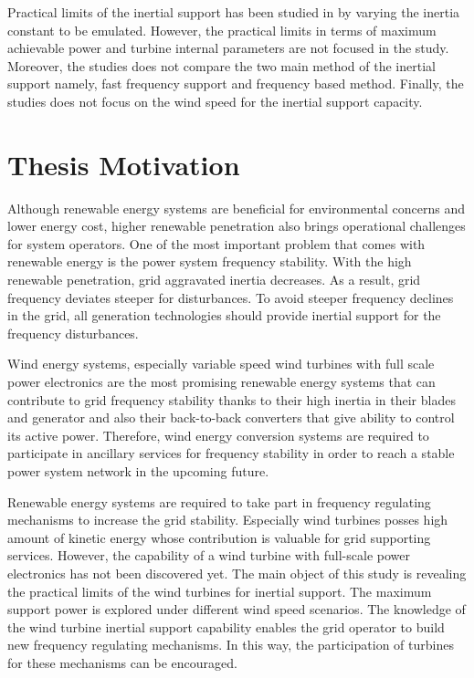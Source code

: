 Practical limits of the inertial support has been studied in \cite{Gonzalez-Longatt2016} by varying the inertia constant to be emulated. However, the practical limits in terms of maximum achievable power and turbine internal parameters are not focused in the study. Moreover, the studies does not compare the two main method of the inertial support namely, fast frequency support and frequency based method. Finally, the studies does not focus on the wind speed for the inertial support capacity. 

\section{Thesis Motivation}
Although renewable energy systems are beneficial for environmental concerns and lower energy cost, higher renewable penetration also brings operational challenges for system operators. One of the most important problem that comes with renewable energy is the power system frequency stability. With the high renewable penetration, grid aggravated inertia decreases. As a result, grid frequency deviates steeper for disturbances. To avoid steeper frequency declines in the grid, all generation technologies should provide inertial support for the frequency disturbances.\par
Wind energy systems, especially variable speed wind turbines with full scale power electronics are the most promising renewable energy systems that can contribute to grid frequency stability thanks to their high inertia in their blades and generator and also their back-to-back converters that give ability to control its active power. Therefore, wind energy conversion systems are required to participate in ancillary services for frequency stability in order to reach a stable power system network in the upcoming future. \par
Renewable energy systems are required to take part in frequency regulating mechanisms to increase the grid stability. Especially wind turbines posses high amount of kinetic energy whose contribution is valuable for grid supporting services. However, the capability of a wind turbine with full-scale power electronics has not been discovered yet. The main object of this study is revealing the practical limits of the wind turbines for inertial support. The maximum support power is explored under different wind speed scenarios. The knowledge of the wind turbine inertial support capability enables the grid operator to build new frequency regulating mechanisms. In this way, the participation of turbines for these mechanisms can be encouraged. \par
